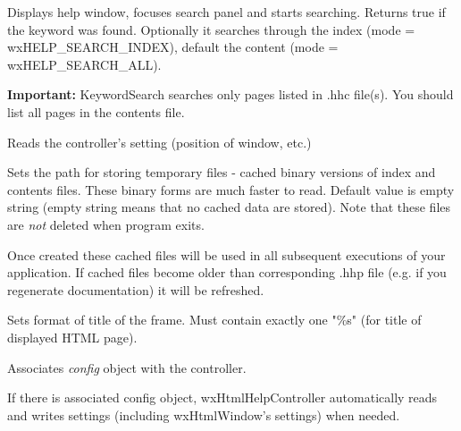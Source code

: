 
Displays help window, focuses search panel and starts searching.  Returns true
if the keyword was found. Optionally it searches through the index (mode =
wxHELP\_SEARCH\_INDEX), default the content (mode = wxHELP\_SEARCH\_ALL).

{\bf Important:} KeywordSearch searches only pages listed in .hhc file(s).
You should list all pages in the contents file.

\label{wxhtmlhelpcontrollerreadcustomization}


Reads the controller's setting (position of window, etc.)

\label{wxhtmlhelpcontrollersettempdir}


Sets the path for storing temporary files - cached binary versions of index and contents files. These binary
forms are much faster to read. Default value is empty string (empty string means
that no cached data are stored). Note that these files are {\it not} 
deleted when program exits.

Once created these cached files will be used in all subsequent executions 
of your application. If cached files become older than corresponding .hhp
file (e.g. if you regenerate documentation) it will be refreshed.

\label{wxhtmlhelpcontrollersettitleformat}


Sets format of title of the frame. Must contain exactly one "\%s"
(for title of displayed HTML page).

\label{wxhtmlhelpcontrolleruseconfig}


Associates {\it config} object with the controller.

If there is associated config object, wxHtmlHelpController automatically
reads and writes settings (including wxHtmlWindow's settings) when needed.

